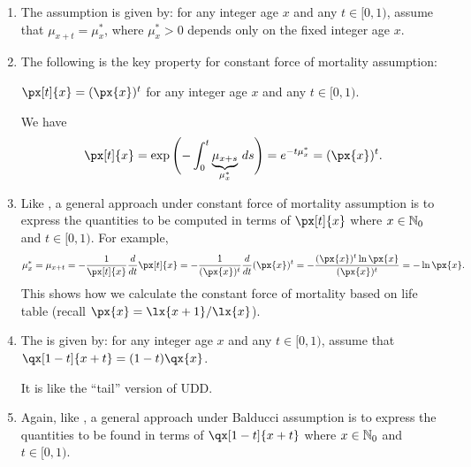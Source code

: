 \begin{enumerate}
\item The  assumption is given by: for any
integer age \(x\) and any \(t\in[0,1)\), assume that \(\mu_{x+t}=\mu_x^*\),
where \(\mu_x^*>0\) depends only on the fixed integer age \(x\).
\item The following is the key property for constant force of mortality
assumption:
\begin{proposition}
\label{prp:cfm-key-prop}
\(\px[t]{x}=(\px{x})^t\) for any integer age \(x\) and any \(t\in[0,1)\).
\end{proposition}
\begin{pf}
We have
\[
\px[t]{x}=\exp\qty\Bigg(-\int_{0}^{t}\underbrace{\mu_{x+s}}_{\mu_x^*}\,ds)
=e^{-t\mu_x^*}
=(\px{x})^t.
\]
\end{pf}
\item Like , a general approach under constant force
of mortality assumption is to express the quantities to be computed in terms of
\(\px[t]{x}\) where \(x\in\mathbb{N}_0\) and \(t\in[0,1)\). For example,
\[\mu_x^*=\mu_{x+t}
=-\frac{1}{\px[t]{x}}\frac{d}{dt}\px[t]{x}
=-\frac{1}{(\px{x})^t}\frac{d}{dt}(\px{x})^t
=-\frac{(\px{x})^t\ln\px{x}}{(\px{x})^t}
=-\ln\px{x}.
\]
This shows how we calculate the constant force of mortality based on life table
(recall \(\px{x}=\lx{x+1}/\lx{x}\)).
\item The  is given by: for any integer age \(x\) and
any \(t\in [0,1)\), assume that \(\qx[1-t]{x+t}=(1-t)\qx{x}\). \begin{note}
It is like the ``tail'' version of UDD.
\end{note}
\item Again, like , a general approach under
Balducci assumption is to express the quantities to be found in terms of
\(\qx[1-t]{x+t}\) where \(x\in\mathbb{N}_0\) and \(t\in[0,1)\).
\end{enumerate}
